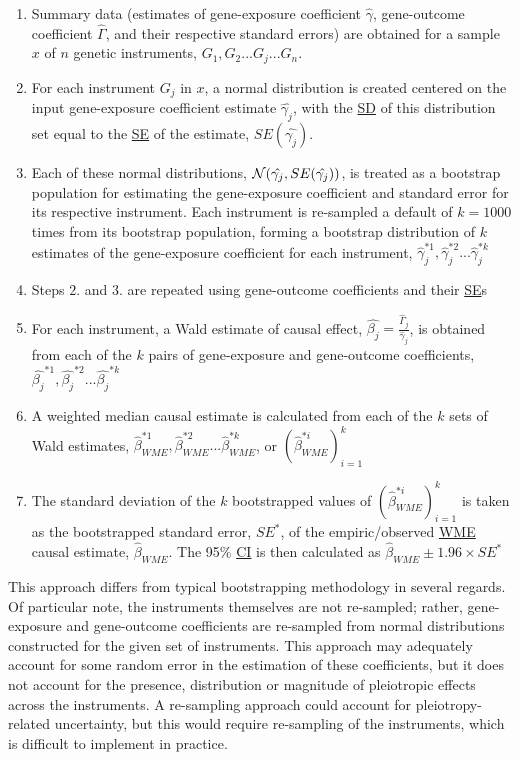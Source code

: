 \documentclass[
]{article}
\providecommand{\tightlist}{%
  \setlength{\itemsep}{0pt}\setlength{\parskip}{0pt}}
\begin{document}
\begin{enumerate}
\def\labelenumi{\arabic{enumi}.}
\tightlist
\item
  Summary data (estimates of gene-exposure coefficient \(\hat{\gamma}\), gene-outcome coefficient \(\hat{\Gamma}\), and their respective standard errors) are obtained for a sample \(x\) of \(n\) genetic instruments, \(G_1, G_2...G_j...G_n\).
\item
  For each instrument \(G_j\) in \(x\), a normal distribution is created centered on the input gene-exposure coefficient estimate \(\hat{\gamma_j}\), with the \hyperref[acronyms_SD]{SD} of this distribution set equal to the \hyperref[acronyms_SE]{SE} of the estimate, \(SE({\hat{\gamma_j}})\).
\item
  Each of these normal distributions, \(\mathcal{N}(\space \hat{\gamma_j}, \space SE({\hat{\gamma_j}})\space)\), is treated as a bootstrap population for estimating the gene-exposure coefficient and standard error for its respective instrument. Each instrument is re-sampled a default of \(k = 1000\) times from its bootstrap population, forming a bootstrap distribution of \(k\) estimates of the gene-exposure coefficient for each instrument, \(\hat{\gamma}_j^{*1}, \hat{\gamma}_j^{*2}...\hat{\gamma}_j^{*k}\)
\item
  Steps \(2.\) and \(3.\) are repeated using gene-outcome coefficients and their \hyperref[acronyms_SE]{SE}s
\item
  For each instrument, a Wald estimate of causal effect, \(\hat{\beta_j} = \frac{\hat{\Gamma}_j}{\hat{\gamma}_j}\), is obtained from each of the \(k\) pairs of gene-exposure and gene-outcome coefficients, \(\hat{\beta_j}^{*1}, \hat{\beta_j}^{*2}...\hat{\beta_j}^{*k}\)
\item
  A weighted median causal estimate is calculated from each of the \(k\) sets of Wald estimates, \(\hat{\beta}_{WME}^{*1}, \hat{\beta}_{WME}^{*2}...\hat{\beta}_{WME}^{*k}\), or \((\hat{\beta}_{WME}^{*i})_{i=1}^k\)
\item
  The standard deviation of the \(k\) bootstrapped values of \((\hat{\beta}_{WME}^{*i})_{i=1}^k\) is taken as the bootstrapped standard error, \(SE^*\), of the empiric/observed \hyperref[acronyms_WME]{WME} causal estimate, \(\hat{\beta}_{WME}\). The 95\% \hyperref[acronyms_CI]{CI} is then calculated as \(\hat{\beta}_{WME} \pm 1.96  \times SE^*\)
\end{enumerate}

This approach differs from typical bootstrapping methodology in several regards. Of particular note, the instruments themselves are not re-sampled; rather, gene-exposure and gene-outcome coefficients are re-sampled from normal distributions constructed for the given set of instruments. This approach may adequately account for some random error in the estimation of these coefficients, but it does not account for the presence, distribution or magnitude of pleiotropic effects across the instruments. A re-sampling approach could account for pleiotropy-related uncertainty, but this would require re-sampling of the instruments, which is difficult to implement in practice.
\end{document}
